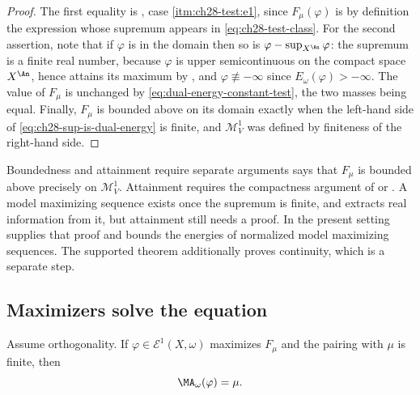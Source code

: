 \begin{proof}
The first equality is , case
\cref{itm:ch28-test:e1}, since $F_\mu(\varphi)$ is by definition the
expression whose supremum appears in \eqref{eq:ch28-test-class}.  For the
second assertion, note that if $\varphi$ is in the domain then so is
$\varphi-\sup_{X^{\An}}\varphi$: the supremum is a finite real number,
because $\varphi$ is upper semicontinuous on the compact space
$X^{\An}$, hence attains its maximum by , and
$\varphi\not\equiv-\infty$ since $E_\omega(\varphi)>-\infty$.  The value
of $F_\mu$ is unchanged by \eqref{eq:dual-energy-constant-test}, the two
masses being equal.  Finally, $F_\mu$ is bounded above on its domain
exactly when the left-hand side of \eqref{eq:ch28-sup-is-dual-energy} is
finite, and $\mathcal M^1_V$ was defined by finiteness of the right-hand
side.
\end{proof}

\begin{warning}{Boundedness and attainment require separate arguments}
 says that $F_\mu$ is bounded above
precisely on $\mathcal M^1_V$.  Attainment requires the compactness argument of
 or
.  A model maximizing
sequence exists once the supremum is finite, and
 extracts real information from
it, but attainment still needs a proof.  In the present setting
 supplies that proof and bounds the
energies of normalized model maximizing sequences.  The supported
theorem additionally proves continuity, which is a separate step.
\end{warning}

\subsection{Maximizers solve the equation}
\label{sec:ch28-maximizers-solve}

\begin{proposition}
\label{prop:variational-maximizer-solves}
Assume orthogonality.  If $\varphi\in\mathcal E^1(X,\omega)$ maximizes
$F_\mu$ and the pairing with $\mu$ is finite, then
\begin{equation}
\label{eq:variational-ma-equation}
                         \MA_\omega(\varphi)=\mu.
\end{equation}
\end{proposition}

